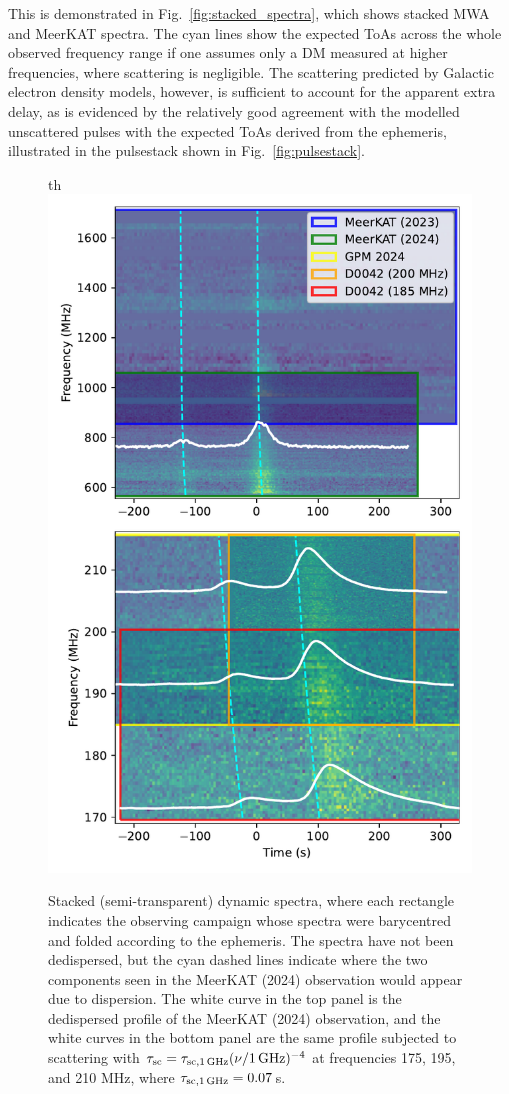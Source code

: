 \documentclass[fleqn,usenatbib]{mnras}
\newcommand{\Fig}{Fig.}
\begin{document}
This is demonstrated in \Fig~\ref{fig:stacked_spectra}, which shows stacked MWA and MeerKAT spectra.
The cyan lines show the expected ToAs across the whole observed frequency range if one assumes only a DM measured at higher frequencies, where scattering is negligible.
The scattering predicted by Galactic electron density models, however, is sufficient to account for the apparent extra delay, as is evidenced by the relatively good agreement with the modelled unscattered pulses with the expected ToAs derived from the ephemeris, illustrated in the pulsestack shown in \Fig~\ref{fig:pulsestack}.

\begin{figure}{th}
      \centering
          \includegraphics[width=0.95\linewidth]{stacked_spectra.pdf}
              \caption{Stacked (semi-transparent) dynamic spectra, where each rectangle indicates the observing campaign whose spectra were barycentred and folded according to the ephemeris. The spectra have not been dedispersed, but the cyan dashed lines indicate where the two components seen in the MeerKAT (2024) observation would appear due to dispersion. The white curve in the top panel is the dedispersed profile of the MeerKAT (2024) observation, and the white curves in the bottom panel are the same profile subjected to scattering with $\tau_{\rm sc} = \tau_{\rm sc,1\,GHz} (\nu/{\rm 1\,GHz})^{-4}$ at frequencies 175, 195, and 210 MHz, where $\tau_{\rm sc,1\,GHz} = 0.07\,$s.}

\end{figure}
\end{document}
